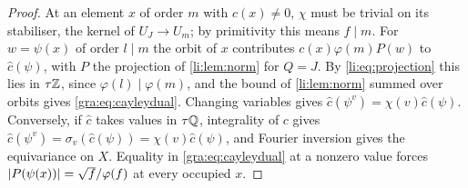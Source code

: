 
\begin{proof}
At an element $x$ of order $m$ with $c(x)\ne0$, $\chi$ must be trivial on
its stabiliser, the kernel of $U_J\to U_m$; by primitivity this means
$f\mid m$. For $w=\psi(x)$ of order $l\mid m$ the orbit of $x$ contributes
$c(x)\varphi(m)P(w)$ to $\widehat c(\psi)$, with $P$ the projection of
\cref{li:lem:norm} for $Q=J$. By \eqref{li:eq:projection} this lies in
$\tau\mathbb{Z}$, since $\varphi(l)\mid\varphi(m)$, and the bound of
\cref{li:lem:norm} summed over orbits gives \eqref{gra:eq:cayleydual}.
Changing variables gives $\widehat c(\psi^v)=\chi(v)\widehat c(\psi)$.
Conversely, if $\widehat c$ takes values in $\tau\mathbb{Q}$, integrality of $c$
gives $\widehat c(\psi^v)=\sigma_v(\widehat c(\psi))=\chi(v)\widehat
c(\psi)$, and Fourier inversion gives the equivariance on $X$. Equality in
\eqref{gra:eq:cayleydual} at a nonzero value forces
$\lvert P(\psi(x))\rvert=\sqrt f/\varphi(f)$ at every occupied $x$.
\end{proof}

